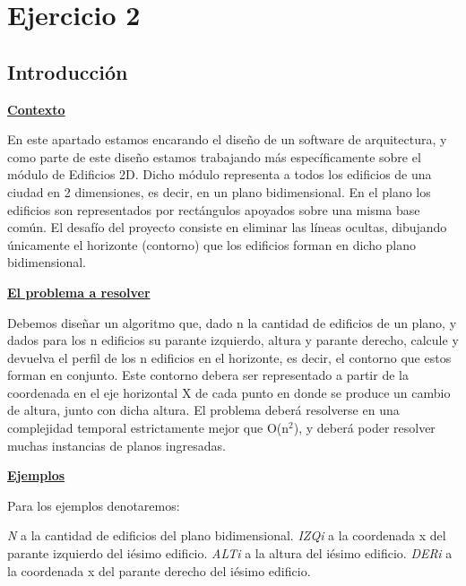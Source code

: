 \documentclass[10pt,a4paper]{article}
\begin{document}
\section{Ejercicio 2}

\subsection{Introducción}

\noindent \underline{\textbf{Contexto}}

En este apartado estamos encarando el diseño de un software de arquitectura, y como parte de este diseño estamos trabajando más específicamente sobre el módulo de Edificios 2D.
Dicho módulo representa a todos los edificios de una ciudad en 2 dimensiones, es decir, en un plano bidimensional. En el plano los edificios son representados por rectángulos apoyados sobre una misma base común. El desafío del proyecto consiste en eliminar las líneas ocultas, dibujando únicamente el horizonte (contorno) que los edificios forman en dicho plano bidimensional.

\noindent \underline{\textbf{El problema a resolver}}

Debemos diseñar un algoritmo que, dado n la cantidad de edificios de un plano, y dados para los n edificios su parante izquierdo, altura y parante derecho, calcule y devuelva el perfil de los n edificios en el horizonte, es decir, el contorno que estos forman en conjunto.
Este contorno debera ser representado a partir de la coordenada en el eje horizontal X de cada punto en donde se produce un cambio de altura, junto con dicha altura.
El problema deberá resolverse en una complejidad temporal estrictamente mejor que O(n$^2$), y deberá poder resolver muchas instancias de planos ingresadas.

\noindent \underline{\textbf{Ejemplos}}

\noindent Para los ejemplos denotaremos:

\textit{N} a la cantidad de edificios del plano bidimensional. \newline
\indent \textit{IZQi} a la coordenada x del parante izquierdo del iésimo edificio. \newline
\indent \textit{ALTi} a la altura del iésimo edificio. \newline
\indent \textit{DERi} a la coordenada x del parante derecho del iésimo edificio.
\end{document}
